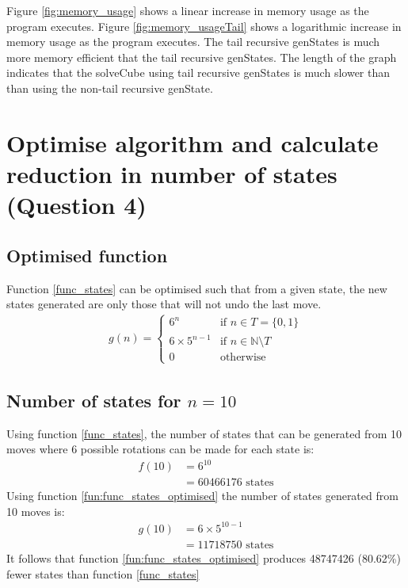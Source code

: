 \documentclass[]{article}
\begin{document}
 Figure \ref{fig:memory_usage} shows a linear increase in memory usage as the program executes. Figure \ref{fig:memory_usageTail} shows a logarithmic increase in memory usage as the program executes. The tail recursive genStates is much more memory efficient that the tail recursive genStates. The length of the graph indicates that the solveCube using tail recursive genStates is much slower than than using the non-tail recursive genState. 

\section{Optimise algorithm and calculate reduction in number of states (Question 4)}
\subsection{Optimised function}							
Function \ref{func_states} can be optimised such that from a given state, the new states generated are only those that will not undo the last move.
\begin{equation}
\begin{split}
g(n) =
\begin{cases}
	6^{n} & \text{if }n \in T = \{0, 1\}\\
	6 \times 5^{n-1} & \text{if }n \in \mathbb{N} \setminus T\\
	0 & \text{otherwise}
\end{cases}
\end{split}
\label{fun:func_states_optimised}
\end{equation}
\subsection{Number of states for \(n = 10\)}
Using function \ref{func_states}, the number of states that can be generated from 10 moves where 6 possible rotations can be made for each state is:
\begin{equation*}
\begin{split}
f(10) & = 6^{10} \\
& = 60466176\text{ states}
\end{split}
\end{equation*}	
Using function \ref{fun:func_states_optimised} the number of states generated from 10 moves is:
\begin{equation*}
\begin{split}
  g(10) & = 6 \times 5^{10-1} \\
		  & = 11718750\text{ states}
\end{split}
\end{equation*}
It follows that function \ref{fun:func_states_optimised} produces 48747426 (80.62\%) fewer states than function \ref{func_states}
\end{document}
